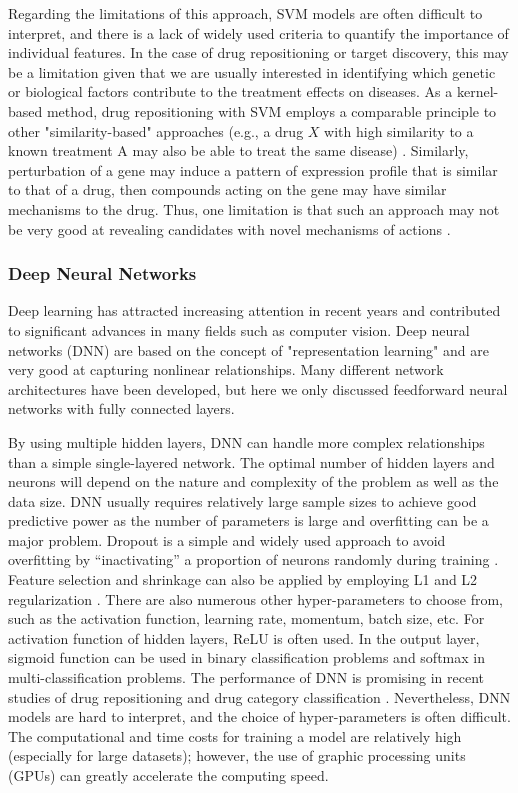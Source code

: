       Regarding the limitations of this approach, SVM models are often difficult to interpret, and there is a lack of widely used criteria to quantify the importance of individual features. In the case of drug repositioning or target discovery, this may be a limitation given that we are usually interested in identifying which genetic or biological factors contribute to the treatment effects on diseases. As a kernel-based method, drug repositioning with SVM employs a comparable principle to other "similarity-based" approaches (e.g., a drug $X$ with high similarity to a known treatment A may also be able to treat the same disease) \cite{hodos2016silico}. Similarly, perturbation of a gene may induce a pattern of expression profile that is similar to that of a drug, then compounds acting on the gene may have similar mechanisms to the drug. Thus, one limitation is that such an approach may not be very good at revealing candidates with novel mechanisms of actions \cite{hodos2016silico}.

    \subsubsection{Deep Neural Networks}
      Deep learning has attracted increasing attention in recent years and contributed to significant advances in many fields such as computer vision. Deep neural networks (DNN) are based on the concept of  "representation learning" \cite{bengio2013representation} and are very good at capturing nonlinear relationships. Many different network architectures have been developed, but here we only discussed feedforward neural networks with fully connected layers.

      By using multiple hidden layers, DNN can handle more complex relationships than a simple single-layered network. The optimal number of hidden layers and neurons will depend on the nature and complexity of the problem as well as the data size. DNN usually requires relatively large sample sizes to achieve good predictive power as the number of parameters is large and overfitting can be a major problem. Dropout is a simple and widely used approach to avoid overfitting by “inactivating” a proportion of neurons randomly during training \cite{srivastava2014dropout}. Feature selection and shrinkage can also be applied by employing L1 and L2 regularization \cite{zou2005regularization}. There are also numerous other hyper-parameters to choose from, such as the activation function, learning rate, momentum, batch size, etc. For activation function of hidden layers, ReLU is often used. In the output layer, sigmoid function can be used in binary classification problems and softmax in multi-classification problems. The performance of DNN is promising in recent studies of drug repositioning and drug category classification \cite{aliper2016deep,zhao2018drug}. Nevertheless, DNN models are hard to interpret, and the choice of hyper-parameters is often difficult. The computational and time costs for training a model are relatively high (especially for large datasets); however, the use of graphic processing units (GPUs) can greatly accelerate the computing speed.

